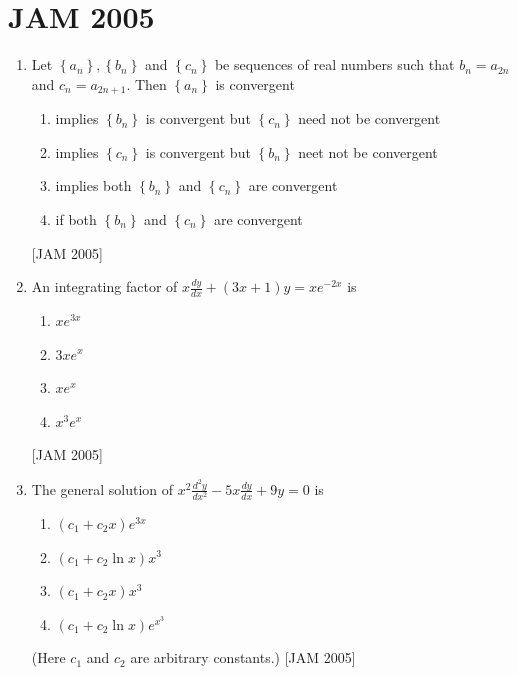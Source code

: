 \section{JAM 2005}
\begin{enumerate}
\item 
 Let $\left\{a_{n}\right\},\left\{b_{n}\right\}$ and $\left\{c_{n}\right\}$ be sequences of real numbers such that $b_{n}=a_{2 n}$ and $c_{n}=a_{2 n+1}$. Then $\left\{a_{n}\right\}$ is convergent
 \begin{enumerate}
     \item implies $\left\{b_{n}\right\}$ is convergent but $\left\{c_{n}\right\}$ need not be convergent

     \item implies $\left\{c_{n}\right\}$ is convergent but $\left\{b_{n}\right\}$ neet not be convergent

     \item implies both $\left\{b_{n}\right\}$ and $\left\{c_{n}\right\}$ are convergent

     \item if both $\left\{b_{n}\right\}$ and $\left\{c_{n}\right\}$ are convergent
 \end{enumerate}
 \hfill [JAM 2005]


\item  An integrating factor of $x \frac{d y}{d x}+(3 x+1) y=x e^{-2 x}$ is
 \begin{enumerate}
     \item  $x e^{3 x}$
 \item  $3 x e^{x}$
 \item  $x e^{x}$
 \item  $x^{3} e^{x}$ 
 \end{enumerate}
 \hfill [JAM 2005]
 
\item The general solution of $x^{2} \frac{d^{2} y}{d x^{2}}-5 x \frac{d y}{d x}+9 y=0$ is
\begin{enumerate}
     \item  $\left(c_{1}+c_{2} x\right) e^{3 x}$
     \item  $\left(c_{1}+c_{2} \ln x\right) x^{3}$
     \item  $\left(c_{1}+c_{2} x\right) x^{3}$
     \item $\left(c_{1}+c_{2} \ln x\right) e^{x^{3}}$
 \end{enumerate}
(Here $c_{1}$ and $c_{2}$ are arbitrary constants.)
 \hfill [JAM 2005]





\end{enumerate}
